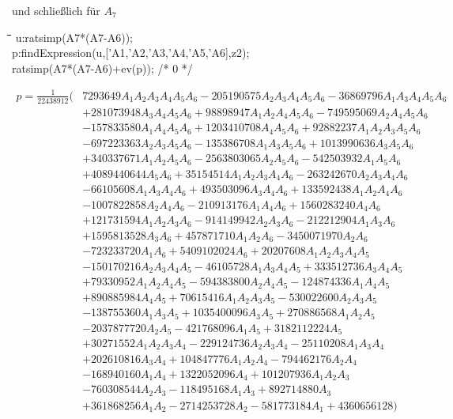 \documentclass[11pt]{article}
\newenvironment{code}{\tt \begin{tabbing}
\hskip12pt\=\hskip12pt\=\hskip12pt\=\hskip12pt\=\hskip5cm\=\hskip5cm\=\kill}
{\end{tabbing}}
\begin{document}
und schließlich für $A_7$
\begin{code}
u:ratsimp(A7*(A7-A6));\\
p:findExpression(u,['A1,'A2,'A3,'A4,'A5,'A6],z2);\\
ratsimp(A7*(A7-A6)+ev(p)); /* 0 */
\end{code}
\begin{align*}
  p=\frac{1}{22438912}\Big(& 7293649A_{1}A_{2}A_{3}A_{4}A_{5}A_{6}
  -205190575A_{2}A_{3}A_{4}A_{5}A_{6} -36869796A_{1}A_{3}A_{4}A_{5}A_{6}
  \\&+281073948A_{3}A_{4}A_{5}A_{6} +98898947A_{1}A_{2}A_{4}A_{5}A_{6}
  -749595069A_{2}A_{4}A_{5}A_{6}\\&-157833580A_{1}A_{4}A_{5}A_{6}
  +1203410708A_{4}A_{5}A_{6}+92882237A_{1}A_{2}A_{3}A_{5}A_{6}
  \\&-697223363A_{2}A_{3}A_{5}A_{6}-135386708A_{1}A_{3}A_{5}A_{6}
  +1013990636A_{3}A_{5}A_{6}\\&+340337671A_{1}A_{2}A_{5}A_{6}
  -2563803065A_{2}A_{5}A_{6}-542503932A_{1}A_{5}A_{6} \\&+4089440644A_{5}A_{6}
  +35154514A_{1}A_{2}A_{3}A_{4}A_{6} -263242670A_{2}A_{3}A_{4}A_{6}
  \\&-66105608A_{1}A_{3}A_{4}A_{6} +493503096A_{3}A_{4}A_{6}
  +133592438A_{1}A_{2}A_{4}A_{6} \\&-1007822858A_{2}A_{4}A_{6}
  -210913176A_{1}A_{4}A_{6} +1560283240A_{4}A_{6}
  \\&+121731594A_{1}A_{2}A_{3}A_{6} -914149942A_{2}A_{3}A_{6}
  -212212904A_{1}A_{3}A_{6} \\&+1595813528A_{3}A_{6} +457871710A_{1}A_{2}A_{6}
  -3450071970A_{2}A_{6}\\&-723233720A_{1}A_{6}+5409102024A_{6}
  +20207608A_{1}A_{2}A_{3}A_{4}A_{5}\\&-150170216A_{2}A_{3}A_{4}A_{5}
  -46105728A_{1}A_{3}A_{4}A_{5}+333512736A_{3}A_{4}A_{5}
  \\&+79330952A_{1}A_{2}A_{4}A_{5}-594383800A_{2}A_{4}A_{5}
  -124874336A_{1}A_{4}A_{5}\\&+890885984A_{4}A_{5} +70615416A_{1}A_{2}A_{3}A_{5}
  -530022600A_{2}A_{3}A_{5}\\&-138755360A_{1}A_{3}A_{5}+1035400096A_{3}A_{5}
  +270886568A_{1}A_{2}A_{5}\\&-2037877720A_{2}A_{5}-421768096A_{1}A_{5}
  +3182112224A_{5}\\&+30271552A_{1}A_{2}A_{3}A_{4} -229124736A_{2}A_{3}A_{4}
  -25110208A_{1}A_{3}A_{4}\\&+202610816A_{3}A_{4}+104847776A_{1}A_{2}A_{4}
  -794462176A_{2}A_{4}\\&-168940160A_{1}A_{4}+1322052096A_{4}
  +101207936A_{1}A_{2}A_{3} \\&-760308544A_{2}A_{3}-118495168A_{1}A_{3}
  +892714880A_{3}\\&+361868256A_{1}A_{2}-2714253728A_{2}-581773184A_{1}
  +4360656128\Big)
\end{align*}
\end{document}
